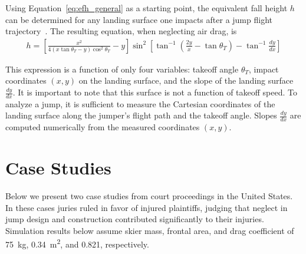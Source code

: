 \documentclass{article}
\begin{document}
Using Equation~\ref{eq:efh_general} as a starting point, the equivalent fall
height $h$ can be determined for any landing surface one impacts after a jump
flight trajectory~\cite{Hubbard2012}. The resulting equation, when neglecting
air drag, is
%
\begin{align}
  h = \left[\frac{x^2}{4(x\tan\theta_T - y)\cos^{2}\theta_T} -
    y\right]\sin^{2}\left[\tan^{-1}\left(\frac{2y}{x}- \tan\theta_T\right) - \tan^{-1}\frac{dy}{dx}\right]
  \label{eq:efh}
\end{align}

This expression is  a function of only four variables: takeoff angle $\theta_T$,
impact coordinates $(x,y)$ on the landing surface, and the slope of the landing
surface $\frac{dy}{dx}$. It is important to note that this surface is not a
function of takeoff speed. To analyze a jump, it is sufficient to measure the
Cartesian coordinates of the landing surface along the jumper's flight path and
the takeoff angle. Slopes $\frac{dy}{dx}$ are computed numerically from the measured
coordinates $(x,y)$.

\section{Case Studies}
%
Below we present two case studies from court proceedings in the United States.
In these cases juries ruled in favor of injured plaintiffs,
judging that neglect in jump design and construction 
contributed significantly to their injuries. Simulation results
below assume skier mass, frontal area, and drag coefficient of 75~\si{\kg},
0.34~\si{\meter\squared}, and 0.821, respectively.
\end{document}
